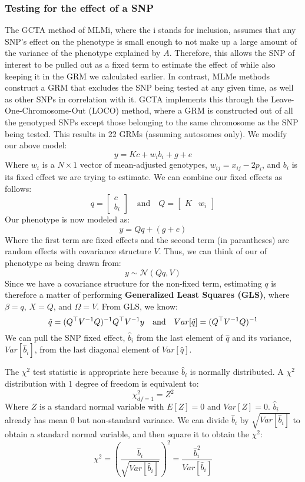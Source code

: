 \documentclass[12pt]{article}
\begin{document}
\subsubsection{Testing for the effect of a SNP}
The GCTA method of MLMi, where the i stands for inclusion, assumes that any SNP's effect on the phenotype is small enough to not make up a large amount of the variance of the phenotype explained by $A$.
Therefore, this allows the SNP of interest to be pulled out as a fixed term to estimate the effect of while also keeping it in the GRM we calculated earlier.
In contrast, MLMe methods construct a GRM that excludes the SNP being tested at any given time, as well as other SNPs in correlation with it.
GCTA implements this through the Leave-One-Chromosome-Out (LOCO) method, where a GRM is constructed out of all the genotyped SNPs except those belonging to the same chromosome as the SNP being tested.
This results in 22 GRMs (assuming autosomes only).
We modify our above model:
$$ y = Kc + w_i b_i + g + e $$
Where $w_i$ is a $N \times 1$ vector of mean-adjusted genotypes, $w_{ij} = x_{ij} - 2 p_i$, and $b_i$ is its fixed effect we are trying to estimate. We can combine our fixed effects as follows:
\begin{equation*}
q = \begin{bmatrix} c \\ b_i \end{bmatrix}
\quad\mathrm{and}\quad
Q = \begin{bmatrix} K & w_i \end{bmatrix}
\end{equation*}
Our phenotype is now modeled as:
$$ y = Q q + (g + e) $$
Where the first term are fixed effects and the second term (in parantheses) are random effects with covariance structure $V$. Thus, we can think of our of phenotype as being drawn from:
$$ y \sim \mathcal{N} (Q q, V) $$
Since we have a covariance structure for the non-fixed term, estimating $q$ is therefore a matter of performing \textbf{Generalized Least Squares (GLS)}, where $\beta = q$, $X = Q$, and $\Omega = V$. From GLS, we know:
\begin{equation*}
    \hat{q} = (Q^{\operatorname*{\top}} V^{-1} Q)^{-1} Q^{\operatorname*{\top}} V^{-1} y
    \quad\mathrm{and}\quad
    Var[\hat{q}] = (Q^{\operatorname*{\top}} V^{-1} Q)^{-1}
\end{equation*}
We can pull the SNP fixed effect, $\hat{b}_i$ from the last element of $\hat{q}$ and its variance, $Var[\hat{b}_i]$, from the last diagonal element of $Var[\hat{q}]$.

The $\chi^2$ test statistic is appropriate here because $\hat{b}_i$ is normally distributed.
A $\chi^2$ distribution with 1 degree of freedom is equivalent to:
$$ \chi^2_{df=1} = Z^2$$
Where $Z$ is a standard normal variable with $E[Z]=0$ and $Var[Z]=0$. $\hat{b}_i$ already has mean 0 but non-standard variance.
We can divide $\hat{b}_i$ by $\sqrt{Var[\hat{b}_i]}$ to obtain a standard normal variable, and then square it to obtain the $\chi^2$:
$$ \chi^2 = (\frac{\hat{b}_i}{\sqrt{Var[\hat{b}_i]}})^2 = \frac{\hat{b}_i^2}{Var[\hat{b}_i]} $$
\end{document}
